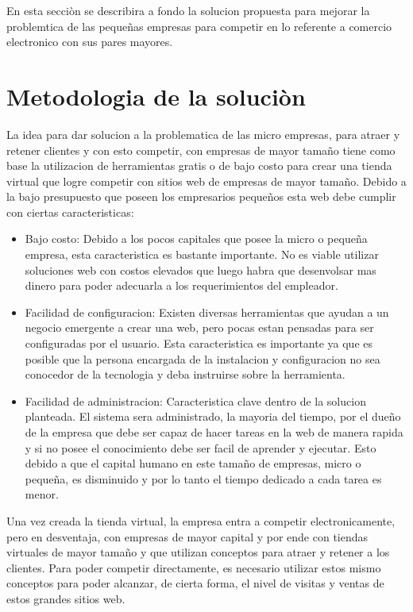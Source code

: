 En esta secciòn se describira a fondo la solucion propuesta para mejorar la problemtica de las pequeñas
empresas para competir en lo referente a comercio electronico con sus pares mayores.

\section{Metodologia de la soluciòn}

La idea para dar solucion a la problematica de las micro empresas, para atraer y retener clientes y
con esto competir, con empresas de mayor tamaño tiene como base la utilizacion de herramientas gratis
o de bajo costo para crear una tienda virtual que logre competir con sitios web de empresas de mayor
tamaño. Debido a la bajo presupuesto que poseen los empresarios pequeños esta web debe cumplir con 
ciertas caracteristicas:

\begin{itemize}

\item Bajo costo: Debido a los pocos capitales que posee la micro o pequeña empresa, esta caracteristica es 
bastante importante. No es viable utilizar soluciones web con costos elevados que luego habra que desenvolsar
mas dinero para poder adecuarla a los requerimientos del empleador. 
\item Facilidad de configuracion: Existen diversas herramientas que ayudan a un negocio emergente a crear
una web, pero pocas estan pensadas para ser configuradas por el usuario. Esta caracteristica es importante
ya que es posible que la persona encargada de la instalacion y configuracion no sea conocedor de la tecnologia
y deba instruirse sobre la herramienta.
\item Facilidad de administracion: Caracteristica clave dentro de la solucion planteada. El sistema sera 
administrado, la mayoria del tiempo, por el dueño de la empresa que debe ser capaz de hacer tareas en la web
de manera rapida y si no posee el conocimiento debe ser facil de aprender y ejecutar. Esto debido a que el capital
humano en este tamaño de empresas, micro o pequeña, es disminuido y por lo tanto el tiempo dedicado a cada tarea
es menor.

\end{itemize}

Una vez creada la tienda virtual, la empresa entra a competir electronicamente, pero en desventaja,
con empresas de mayor capital y por ende con tiendas virtuales de mayor tamaño y que utilizan conceptos
para atraer y retener a los clientes. Para poder competir directamente, es necesario utilizar estos mismo 
conceptos para poder alcanzar, de cierta forma, el nivel de visitas y ventas de estos grandes sitios web.

